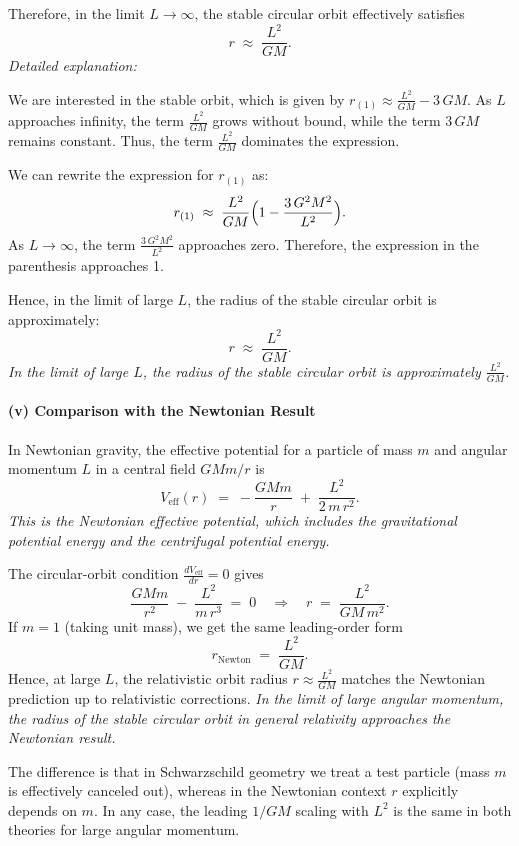 Therefore, in the limit $L \rightarrow \infty$, the stable circular orbit effectively satisfies
\[
r \;\approx\; \frac{L^2}{GM}.
\]
\textit{Detailed explanation:}

We are interested in the stable orbit, which is given by $r_{(1)} \approx \frac{L^2}{GM} - 3\,GM$. As $L$ approaches infinity, the term $\frac{L^2}{GM}$ grows without bound, while the term $3\,GM$ remains constant. Thus, the term $\frac{L^2}{GM}$ dominates the expression.

We can rewrite the expression for $r_{(1)}$ as:
\[
r_{(1)} \;\approx\; \frac{L^2}{GM}\Bigl(1 - \frac{3\,G^2M^2}{L^2}\Bigr).
\]
As $L \rightarrow \infty$, the term $\frac{3\,G^2M^2}{L^2}$ approaches zero. Therefore, the expression in the parenthesis approaches 1.

Hence, in the limit of large $L$, the radius of the stable circular orbit is approximately:
\[
r \;\approx\; \frac{L^2}{GM}.
\]
\textit{In the limit of large $L$, the radius of the stable circular orbit is approximately $\frac{L^2}{GM}$.}

\paragraph{(v) Comparison with the Newtonian Result}

In Newtonian gravity, the effective potential for a particle of mass $m$ and angular momentum $L$ in a central field $GMm/r$ is
\[
V_{\text{eff}}(r)
\;=\;
-\frac{GMm}{r} \;+\;\frac{L^2}{2\,m\,r^2}.
\]
\textit{This is the Newtonian effective potential, which includes the gravitational potential energy and the centrifugal potential energy.}

The circular-orbit condition $\tfrac{dV_{\text{eff}}}{dr} = 0$ gives
\[
\frac{GMm}{r^2} \;-\;\frac{L^2}{m\,r^3} \;=\; 0
\quad\Longrightarrow\quad
r \;=\; \frac{L^2}{GM\,m^2}.
\]
If $m=1$ (taking unit mass), we get the same leading-order form
\[
r_{\text{Newton}}
\;=\;
\frac{L^2}{GM}.
\]
Hence, at large $L$, the relativistic orbit radius $r \approx \tfrac{L^2}{GM}$ matches the Newtonian prediction up to relativistic corrections.
\textit{In the limit of large angular momentum, the radius of the stable circular orbit in general relativity approaches the Newtonian result.}

The difference is that in Schwarzschild geometry we treat a test particle (mass $m$ is effectively canceled out), whereas in the Newtonian context $r$ explicitly depends on $m$. In any case, the leading $1/GM$ scaling with $L^2$ is the same in both theories for large angular momentum.

